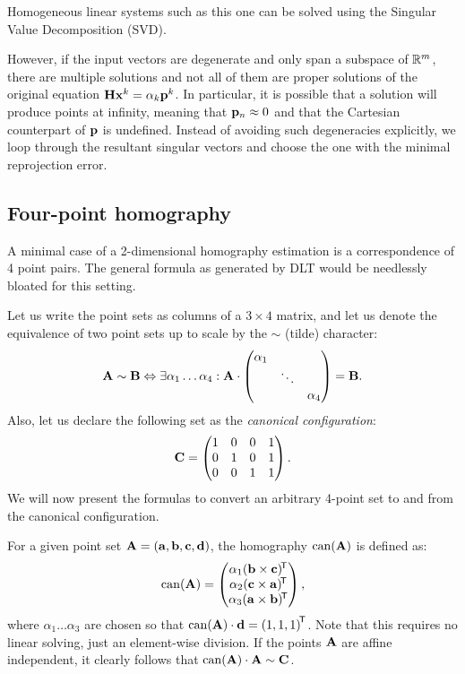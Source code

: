 Homogeneous linear systems such as this one can be solved using the Singular Value Decomposition (SVD).

\todo{\dots}
However, if the input vectors are degenerate and only span a subspace of $\mathbb{R}^m$, there are multiple solutions and not all of them are proper solutions of the original equation $\mathbf{H} \mathbf{x}^k = \alpha_k \mathbf{p}^k$.
In particular, it is possible that a solution will produce points at infinity, meaning that $\mathbf{p}_n \approx 0$ and that the Cartesian counterpart of $\mathbf{p}$ is undefined.
Instead of avoiding such degeneracies explicitly, we loop through the resultant singular vectors and choose the one with the minimal reprojection error.


\subsection{Four-point homography}

A minimal case of a 2-dimensional homography estimation is a correspondence of 4 point pairs.
The general formula as generated by DLT would be needlessly bloated for this setting.

Let us write the point sets as columns of a $3 \times 4$ matrix, and let us denote the equivalence of two point sets up to scale by the $\sim$ (tilde) character:
$$\mathbf{A} \sim \mathbf{B} \Leftrightarrow \exists \alpha_1 \dots \alpha_4 : \mathbf{A} \cdot \begin{pmatrix}
 \alpha_1 & & \\
  & \ddots & \\
 & & \alpha_4
 \end{pmatrix} = \mathbf{B}.$$
Also, let us declare the following set as the \textit{canonical configuration}:
$$\mathbf{C} = \begin{pmatrix}
 1 & 0 & 0 & 1 \\
 0 & 1 & 0 & 1 \\
 0 & 0 & 1 & 1
 \end{pmatrix}.$$
We will now present the formulas to convert an arbitrary 4-point set to and from the canonical configuration.

For a given point set $\mathbf{A} = \left( \mathbf{a}, \mathbf{b}, \mathbf{c}, \mathbf{d} \right)$, the homography $\mathrm{can}(\mathbf{A})$ is defined as:
$$\mathrm{can}(\mathbf{A}) = \begin{pmatrix}
 \alpha_1 (\mathbf{b} \times \mathbf{c}) ^{\!\mathsf{T}} \\
 \alpha_2 (\mathbf{c} \times \mathbf{a}) ^{\!\mathsf{T}} \\
 \alpha_3 (\mathbf{a} \times \mathbf{b}) ^{\!\mathsf{T}} \\
 \end{pmatrix},
$$
where $\alpha_1 \dots \alpha_3$ are chosen so that $\mathrm{can}(\mathbf{A}) \cdot \mathbf{d} = \left( 1, 1, 1 \right)^{\!\mathsf{T}}$.
Note that this requires no linear solving, just an element-wise division.
If the points $\mathbf{A}$ are affine independent, it clearly follows that $\mathrm{can}(\mathbf{A}) \cdot \mathbf{A} \sim \mathbf{C}$.


